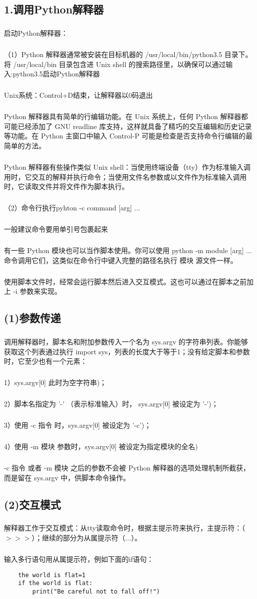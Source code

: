 \documentclass{article}
\begin{document}
\begin{CJK}{UTF8}{gbsn}
\section*{1.调用Python解释器}
\subparagraph*{}
启动Python解释器：
\subparagraph*{}
（1）Python 解释器通常被安装在目标机器的 /usr/local/bin/python3.5 目录下。将 /usr/local/bin 目录包含进 Unix shell 的搜索路径里，以确保可以通过输入:python3.5启动Python解释器
\subparagraph*{}
Unix系统：Control+D结束，让解释器以0码退出
\subparagraph*{}
Python 解释器具有简单的行编辑功能。在 Unix 系统上，任何 Python 解释器都可能已经添加了 GNU readline 库支持，这样就具备了精巧的交互编辑和历史记录等功能。在 Python 主窗口中输入 Control-P 可能是检查是否支持命令行编辑的最简单的方法。
\subparagraph*{}
Python 解释器有些操作类似 Unix shell：当使用终端设备（tty）作为标准输入调用时，它交互的解释并执行命令；当使用文件名参数或以文件作为标准输入调用时，它读取文件并将文件作为脚本执行。
\subparagraph*{}
（2）命令行执行pyhton -c command [arg] ...
\subparagraph*{}
一般建议命令要用单引号包裹起来
\subparagraph*{}
有一些 Python 模块也可以当作脚本使用。你可以使用 python -m module [arg] ... 命令调用它们，这类似在命令行中键入完整的路径名执行 模块 源文件一样。
\subparagraph*{}
使用脚本文件时，经常会运行脚本然后进入交互模式。这也可以通过在脚本之前加上 -i 参数来实现。
\subsection*{(1)参数传递}
\subparagraph*{}
调用解释器时，脚本名和附加参数传入一个名为 sys.argv 的字符串列表。你能够获取这个列表通过执行 import sys，列表的长度大于等于1；没有给定脚本和参数时，它至少也有一个元素：
\subparagraph*{}
1）sys.argv[0] 此时为空字符串)；
\subparagraph*{}
2）脚本名指定为 '-' （表示标准输入）时， sys.argv[0] 被设定为 '-')；
\subparagraph*{}
3）使用 -c 指令 时，sys.argv[0] 被设定为 '-c')；
\subparagraph*{}
4）使用 -m 模块 参数时，sys.argv[0] 被设定为指定模块的全名)
\subparagraph*{}
-c 指令 或者 -m 模块 之后的参数不会被 Python 解释器的选项处理机制所截获，而是留在 sys.argv 中，供脚本命令操作。
\subsection*{(2)交互模式}
\subparagraph*{}
解释器工作于交互模式：从tty读取命令时，根据主提示符来执行，主提示符：（$>>>$）；继续的部分为从属提示符（...）。
\subparagraph*{}
输入多行语句用从属提示符，例如下面的if语句：
\begin{verbatim}
    the world is flat=1
    if the world is flat:
        print("Be careful not to fall off!")
\end{verbatim}

\end{CJK}
\end{document}
